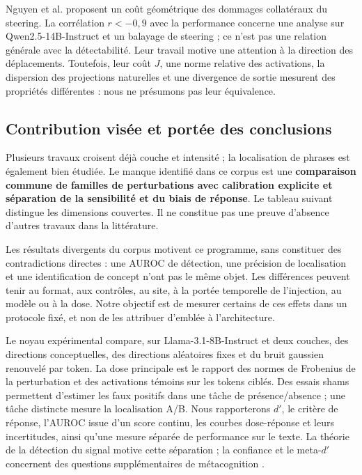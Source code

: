 \documentclass[10pt,a4paper]{article}
\begin{document}
Nguyen et al. \cite{nguyen2026} proposent un coût géométrique des dommages collatéraux du steering. La corrélation $r<-0{,}9$ avec la performance concerne une analyse sur Qwen2.5-14B-Instruct et un balayage de steering ; ce n'est pas une relation générale avec la détectabilité. Leur travail motive une attention à la direction des déplacements. Toutefois, leur coût $J$, une norme relative des activations, la dispersion des projections naturelles et une divergence de sortie mesurent des propriétés différentes : nous ne présumons pas leur équivalence.

\subsection*{Contribution visée et portée des conclusions}

Plusieurs travaux croisent déjà couche et intensité ; la localisation de phrases est également bien étudiée. Le manque identifié dans ce corpus est une \textbf{comparaison commune de familles de perturbations avec calibration explicite et séparation de la sensibilité et du biais de réponse}. Le tableau suivant distingue les dimensions couvertes. Il ne constitue pas une preuve d'absence d'autres travaux dans la littérature.

Les résultats divergents du corpus motivent ce programme, sans constituer des contradictions directes : une AUROC de détection, une précision de localisation et une identification de concept n'ont pas le même objet. Les différences peuvent tenir au format, aux contrôles, au site, à la portée temporelle de l'injection, au modèle ou à la dose. Notre objectif est de mesurer certains de ces effets dans un protocole fixé, et non de les attribuer d'emblée à l'architecture.

Le noyau expérimental compare, sur Llama-3.1-8B-Instruct et deux couches, des directions conceptuelles, des directions aléatoires fixes et du bruit gaussien renouvelé par token. La dose principale est le rapport des normes de Frobenius de la perturbation et des activations témoins sur les tokens ciblés. Des essais shams permettent d'estimer les faux positifs dans une tâche de présence/absence ; une tâche distincte mesure la localisation A/B. Nous rapporterons $d'$, le critère de réponse, l'AUROC issue d'un score continu, les courbes dose-réponse et leurs incertitudes, ainsi qu'une mesure séparée de performance sur le texte. La théorie de la détection du signal motive cette séparation ; la confiance et le meta-$d'$ concernent des questions supplémentaires de métacognition \cite{fleming2014,maniscalco2012}.
\end{document}

